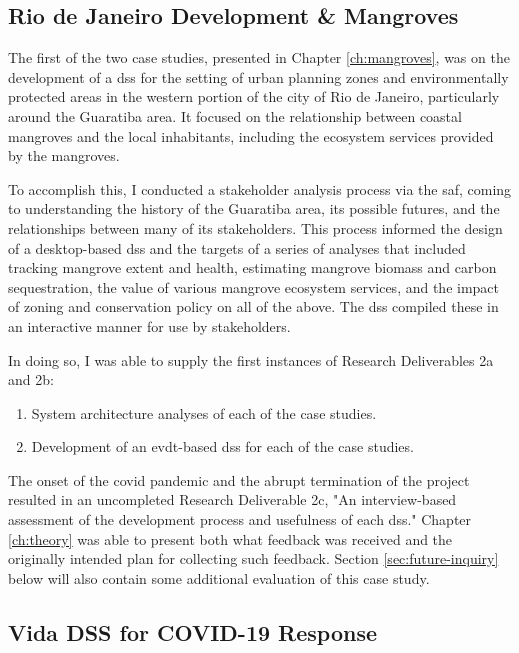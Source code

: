 \subsection{Rio de Janeiro Development \& Mangroves}

The first of the two case studies, presented in Chapter \ref{ch:mangroves}, was on the development of a \ac{dss} for the setting of urban planning zones and environmentally protected areas in the western portion of the city of Rio de Janeiro, particularly around the Guaratiba area. It focused on the relationship between coastal mangroves and the local inhabitants, including the ecosystem services provided by the mangroves.

To accomplish this, I conducted a stakeholder analysis process via the \ac{saf}, coming to understanding the history of the Guaratiba area, its possible futures, and the relationships between many of its stakeholders. This process informed the design of a desktop-based \ac{dss} and the targets of a series of analyses that included tracking mangrove extent and health, estimating mangrove biomass and carbon sequestration, the value of various mangrove ecosystem services, and the impact of zoning and conservation policy on all of the above. The \ac{dss} compiled these in an interactive manner for use by stakeholders.

In doing so, I was able to supply the first instances of Research Deliverables 2a and 2b:

\begin{enumerate}[label=\emph{\alph*},itemsep=0pt,parsep=0pt]
	\item{System architecture analyses of each of the case studies.} 
	\item{Development of an \ac{evdt}-based \ac{dss} for each of the case studies.} 
\end{enumerate}

The onset of the \ac{covid} pandemic and the abrupt termination of the project resulted in an uncompleted Research Deliverable 2c, "An interview-based assessment of the development process and usefulness of each \ac{dss}." Chapter \ref{ch:theory} was able to present both what feedback was received and the originally intended plan for collecting such feedback. Section \ref{sec:future-inquiry} below will also contain some additional evaluation of this case study.

\subsection{Vida DSS for COVID-19 Response}

